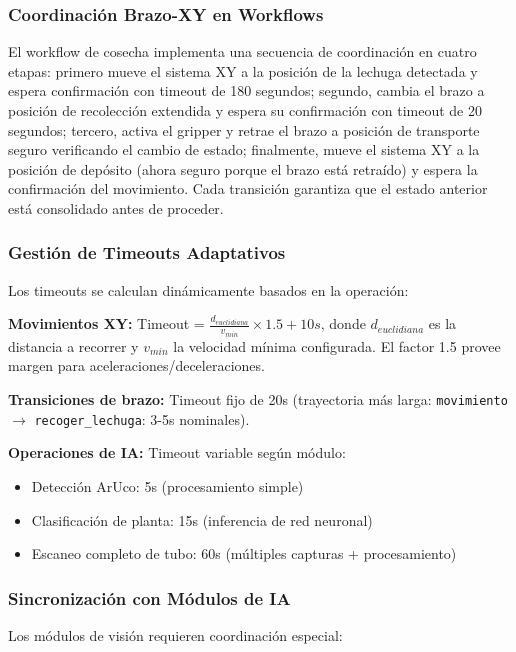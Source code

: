 \subsubsection{Coordinación Brazo-XY en Workflows}

El workflow de cosecha implementa una secuencia de coordinación en cuatro etapas: primero mueve el sistema XY a la posición de la lechuga detectada y espera confirmación con timeout de 180 segundos; segundo, cambia el brazo a posición de recolección extendida y espera su confirmación con timeout de 20 segundos; tercero, activa el gripper y retrae el brazo a posición de transporte seguro verificando el cambio de estado; finalmente, mueve el sistema XY a la posición de depósito (ahora seguro porque el brazo está retraído) y espera la confirmación del movimiento. Cada transición garantiza que el estado anterior está consolidado antes de proceder.

\subsubsection{Gestión de Timeouts Adaptativos}

Los timeouts se calculan dinámicamente basados en la operación:

\textbf{Movimientos XY:} Timeout = $\frac{d_{euclidiana}}{v_{min}} \times 1.5 + 10s$, donde $d_{euclidiana}$ es la distancia a recorrer y $v_{min}$ la velocidad mínima configurada. El factor 1.5 provee margen para aceleraciones/deceleraciones.

\textbf{Transiciones de brazo:} Timeout fijo de 20s (trayectoria más larga: \texttt{movimiento} $\rightarrow$ \texttt{recoger\_lechuga}: 3-5s nominales).

\textbf{Operaciones de IA:} Timeout variable según módulo:
\begin{itemize}
    \item Detección ArUco: 5s (procesamiento simple)
    \item Clasificación de planta: 15s (inferencia de red neuronal)
    \item Escaneo completo de tubo: 60s (múltiples capturas + procesamiento)
\end{itemize}

\subsubsection{Sincronización con Módulos de IA}

Los módulos de visión requieren coordinación especial:

